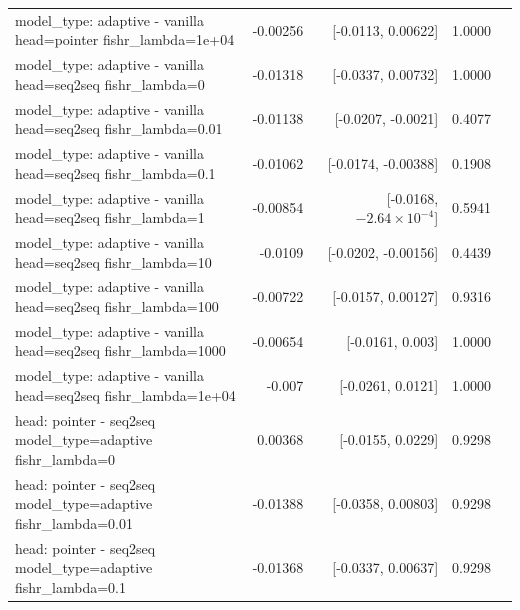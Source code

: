 \documentclass[10pt]{article}
\makeatletter
\newcommand{\stackcell}[1]{\begin{tabular}[t]{@{}l@{}}#1\end{tabular}}
\makeatother
\begin{document}
{\begin{longtable}{lrrrl}
\stackcell{model\_type: adaptive - vanilla\\\footnotesize head=pointer fishr\_lambda=1e+04 } & -0.00256 & [-0.0113, 0.00622] & 1.0000 & \\
\stackcell{model\_type: adaptive - vanilla\\\footnotesize head=seq2seq fishr\_lambda=0 } & -0.01318 & [-0.0337, 0.00732] & 1.0000 & \\
\stackcell{model\_type: adaptive - vanilla\\\footnotesize head=seq2seq fishr\_lambda=0.01 } & -0.01138 & [-0.0207, -0.0021] & 0.4077 & \\
\stackcell{model\_type: adaptive - vanilla\\\footnotesize head=seq2seq fishr\_lambda=0.1 } & -0.01062 & [-0.0174, -0.00388] & 0.1908 & \\
\stackcell{model\_type: adaptive - vanilla\\\footnotesize head=seq2seq fishr\_lambda=1 } & -0.00854 & [-0.0168, $-2.64\times10^{-4}$] & 0.5941 & \\
\stackcell{model\_type: adaptive - vanilla\\\footnotesize head=seq2seq fishr\_lambda=10 } & -0.0109 & [-0.0202, -0.00156] & 0.4439 & \\
\stackcell{model\_type: adaptive - vanilla\\\footnotesize head=seq2seq fishr\_lambda=100 } & -0.00722 & [-0.0157, 0.00127] & 0.9316 & \\
\stackcell{model\_type: adaptive - vanilla\\\footnotesize head=seq2seq fishr\_lambda=1000 } & -0.00654 & [-0.0161, 0.003] & 1.0000 & \\
\stackcell{model\_type: adaptive - vanilla\\\footnotesize head=seq2seq fishr\_lambda=1e+04 } & -0.007 & [-0.0261, 0.0121] & 1.0000 & \\
\stackcell{head: pointer - seq2seq\\\footnotesize model\_type=adaptive fishr\_lambda=0 } & 0.00368 & [-0.0155, 0.0229] & 0.9298 & \\
\stackcell{head: pointer - seq2seq\\\footnotesize model\_type=adaptive fishr\_lambda=0.01 } & -0.01388 & [-0.0358, 0.00803] & 0.9298 & \\
\stackcell{head: pointer - seq2seq\\\footnotesize model\_type=adaptive fishr\_lambda=0.1 } & -0.01368 & [-0.0337, 0.00637] & 0.9298 & \\

\end{longtable}}
\end{document}
